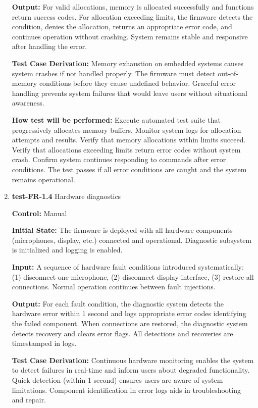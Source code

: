 \documentclass[12pt, titlepage]{article}
\begin{document}
\begin{enumerate}
\textbf{Output:}
For valid allocations, memory is allocated successfully and functions return 
success codes. For allocation exceeding limits, the firmware detects the 
condition, denies the allocation, returns an appropriate error code, and 
continues operation without crashing. System remains stable and responsive 
after handling the error.

\textbf{Test Case Derivation:} 
Memory exhaustion on embedded systems causes system crashes if not handled 
properly. The firmware must detect out-of-memory conditions before they cause 
undefined behavior. Graceful error handling prevents system failures that would 
leave users without situational awareness.
					
\textbf{How test will be performed:}
Execute automated test suite that progressively allocates memory buffers. Monitor 
system logs for allocation attempts and results. Verify that memory allocations 
within limits succeed. Verify that allocations exceeding limits return error 
codes without system crash. Confirm system continues responding to commands 
after error conditions. The test passes if all error conditions are caught and 
the system remains operational.

\item{\textbf{test-FR-1.4} Hardware diagnostics\\}

\textbf{Control:} Manual
					
\textbf{Initial State:} 
The firmware is deployed with all hardware components (microphones, display, 
etc.) connected and operational. Diagnostic subsystem is initialized and logging 
is enabled.
					
\textbf{Input:}
A sequence of hardware fault conditions introduced systematically: (1) disconnect 
one microphone, (2) disconnect display interface, (3) restore all connections. 
Normal operation continues between fault injections.
					
\textbf{Output:}
For each fault condition, the diagnostic system detects the hardware error 
within 1 second and logs appropriate error codes identifying the failed 
component. When connections are restored, the diagnostic system detects recovery 
and clears error flags. All detections and recoveries are timestamped in logs.

\textbf{Test Case Derivation:} 
Continuous hardware monitoring enables the system to detect failures in real-time 
and inform users about degraded functionality. Quick detection (within 1 second) 
ensures users are aware of system limitations. Component identification in error 
logs aids in troubleshooting and repair.
					

\end{enumerate}
\end{document}
